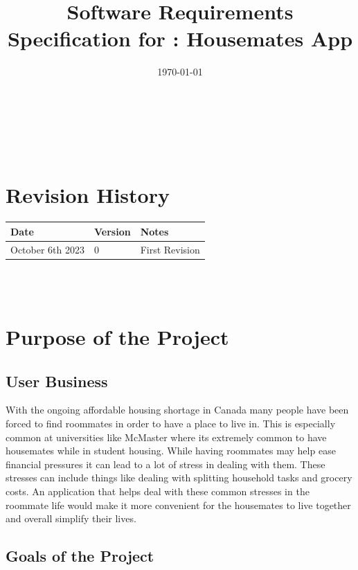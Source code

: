\documentclass[12pt]{article}
\begin{document}
\title{Software Requirements Specification for \progname: Housemates App} 
\author{\authname}
\date{\today}
	
\maketitle

~\newpage


\tableofcontents

~\newpage

\section*{Revision History}

\begin{tabularx}{\textwidth}{p{3cm}p{2cm}X}
\toprule {\textbf{Date}} & {\textbf{Version}} & {\textbf{Notes}}\\
\midrule
October 6th 2023 & 0 & First Revision\\
\bottomrule
\end{tabularx}

~\\

~\newpage
\section{Purpose of the Project}
\subsection{User Business}

With the ongoing affordable housing shortage in Canada many people have been forced to find roommates in order to have a place to live in. This is especially common at universities like McMaster where its extremely common to have housemates while in student housing. While having roommates may help ease financial pressures it can lead to a lot of stress in dealing with them. These stresses can include things like dealing with splitting household tasks and grocery costs. An application that helps deal with these common stresses in the roommate life would make it more convenient  for the housemates to live together and overall simplify their lives.

\subsection{Goals of the Project}
\end{document}
